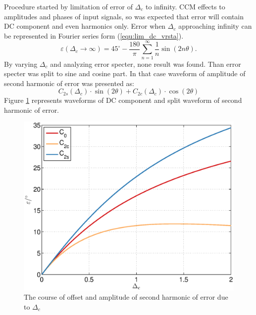 \documentclass[a4paper]{article}
\begin{document}
Procedure started by limitation of error of $\Delta_c$ to infinity. CCM effects to amplitudes and phases of input signals, so was expected that error will contain DC component and even harmonics only.
Error when $\Delta_c$ approaching infinity can be represented in Fourier series form (\ref{equ:lim_dc_vrsta}).
\begin{equation}
\label{equ:lim_dc_vrsta}
\varepsilon(\Delta_c \rightarrow \infty) = 45^\circ -\frac{180}{\pi}\sum_{n=1}^{\infty}\frac{1}{n} \sin( 2 n \theta).
\end{equation}
By varying $\Delta_c$ and analyzing error specter, none result was found.
Than error specter was split to sine and cosine part. In that case waveform of amplitude of second harmonic of error was presented as:
\begin{equation}
C_{2s}(\Delta_c) \cdot\sin(2\theta)+C_{2c}(\Delta_c) \cdot\cos(2\theta)
\end{equation}
Figure \ref{fig:dc} represents waveforms of DC component and split waveform of second harmonic of error.
\begin{figure}[!htb]
	\begin{center}
		\includegraphics[width=\linewidth]{./Slike/dc.eps}
		\caption{The course of offset and amplitude of second harmonic of error due to $\Delta_{c}$} \label{fig:dc}
	\end{center}
\end{figure}
\end{document}
